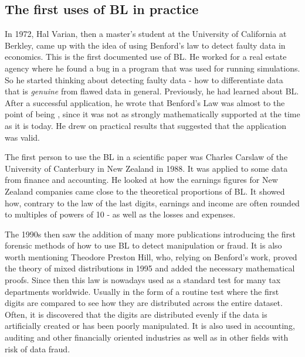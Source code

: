 \subsection{The first uses of BL in practice}  

In 1972, Hal Varian, then a master's student at the University of California at Berkley, came up with the idea of using Benford's law to detect faulty data in economics. This is the first documented use of BL. %
He worked for a real estate agency where he found a bug in a program that was used for running simulations. So he started thinking about detecting faulty data - how to differentiate data that is \emph{genuine} from flawed data in general. Previously, he had learned about BL. After a successful application, he wrote that Benford's Law was almost to the point of being \emph{}, since it was not as strongly mathematically supported at the time as it is today. He drew on practical results that suggested that the application was valid. \cite{kossovsky2014benford} %

The first person to use the BL in a scientific paper was Charles Carslaw of the University of Canterbury in New Zealand in 1988. It was applied to some data from finance and accounting. He looked at how the earnings figures for New Zealand companies came close to the theoretical proportions of BL. It showed how, contrary to the law of the last digits, %
earnings and income are often rounded to multiples of powers of 10 - as well as the losses and expenses. \cite{kossovsky2014benford} %

The 1990s then saw the addition of many more publications %
introducing the first forensic methods of how to use BL to detect manipulation or fraud. It is also worth mentioning Theodore Preston Hill, who, relying on Benford's work, proved the theory of mixed distributions in 1995 and added the necessary mathematical proofs. %
Since then this law is nowadays used as a standard test for many tax departments worldwide. Usually in the form of a routine test where the first digits are compared to see how they are distributed across the entire dataset. Often, it is discovered that the digits are distributed evenly if the data is artificially created or has been poorly manipulated. It is also used in accounting, auditing and other financially oriented industries as well as in other fields with risk of data fraud. \cite{kossovsky2014benford} %

